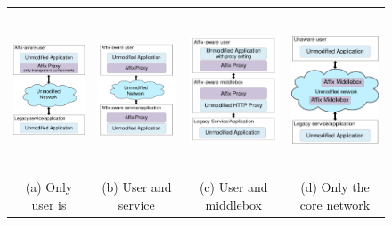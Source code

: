 \begin{figure}[t]
  \centering
  \begin{tabular}{c c c c}  
  \includegraphics[height=4.75cm]{figs/dep3.pdf} \hspace{.05cm} &
  \includegraphics[height=4.75cm]{figs/dep2.pdf} \hspace{.05cm} &
  \includegraphics[height=4.75cm]{figs/dep1.pdf} \hspace{.05cm} &
  \includegraphics[height=4.75cm]{figs/dep4.pdf} \\
  (a) Only user is  \hspace{.05cm} & (b) User and service \hspace{.05cm} &  (c) User and middlebox \hspace{.05cm} &  (d) Only the core network \\

\end{tabular}
\end{figure}
